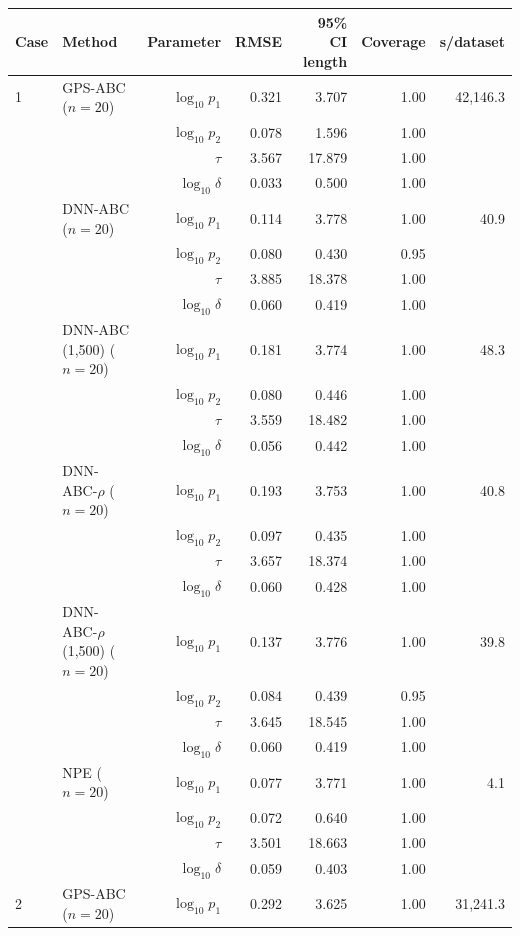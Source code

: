 \begin{tabular}{llrrrrr}
\toprule
Case & Method & Parameter & RMSE & 95\% CI length & Coverage & s/dataset \\
\midrule
1 & GPS-ABC ($n=20$) & $\log_{10}p_1$ & 0.321 & 3.707 & 1.00 & 42,146.3 \\
 &  & $\log_{10}p_2$ & 0.078 & 1.596 & 1.00 &  \\
 &  & $\tau$ & 3.567 & 17.879 & 1.00 &  \\
 &  & $\log_{10}\delta$ & 0.033 & 0.500 & 1.00 &  \\
 & DNN-ABC ($n=20$) & $\log_{10}p_1$ & 0.114 & 3.778 & 1.00 & 40.9 \\
 &  & $\log_{10}p_2$ & 0.080 & 0.430 & 0.95 &  \\
 &  & $\tau$ & 3.885 & 18.378 & 1.00 &  \\
 &  & $\log_{10}\delta$ & 0.060 & 0.419 & 1.00 &  \\
 & DNN-ABC (1,500) ($n=20$) & $\log_{10}p_1$ & 0.181 & 3.774 & 1.00 & 48.3 \\
 &  & $\log_{10}p_2$ & 0.080 & 0.446 & 1.00 &  \\
 &  & $\tau$ & 3.559 & 18.482 & 1.00 &  \\
 &  & $\log_{10}\delta$ & 0.056 & 0.442 & 1.00 &  \\
 & DNN-ABC-$\rho$ ($n=20$) & $\log_{10}p_1$ & 0.193 & 3.753 & 1.00 & 40.8 \\
 &  & $\log_{10}p_2$ & 0.097 & 0.435 & 1.00 &  \\
 &  & $\tau$ & 3.657 & 18.374 & 1.00 &  \\
 &  & $\log_{10}\delta$ & 0.060 & 0.428 & 1.00 &  \\
 & DNN-ABC-$\rho$ (1,500) ($n=20$) & $\log_{10}p_1$ & 0.137 & 3.776 & 1.00 & 39.8 \\
 &  & $\log_{10}p_2$ & 0.084 & 0.439 & 0.95 &  \\
 &  & $\tau$ & 3.645 & 18.545 & 1.00 &  \\
 &  & $\log_{10}\delta$ & 0.060 & 0.419 & 1.00 &  \\
 & NPE ($n=20$) & $\log_{10}p_1$ & 0.077 & 3.771 & 1.00 & 4.1 \\
 &  & $\log_{10}p_2$ & 0.072 & 0.640 & 1.00 &  \\
 &  & $\tau$ & 3.501 & 18.663 & 1.00 &  \\
 &  & $\log_{10}\delta$ & 0.059 & 0.403 & 1.00 &  \\
\midrule
2 & GPS-ABC ($n=20$) & $\log_{10}p_1$ & 0.292 & 3.625 & 1.00 & 31,241.3 \\

\end{tabular}
